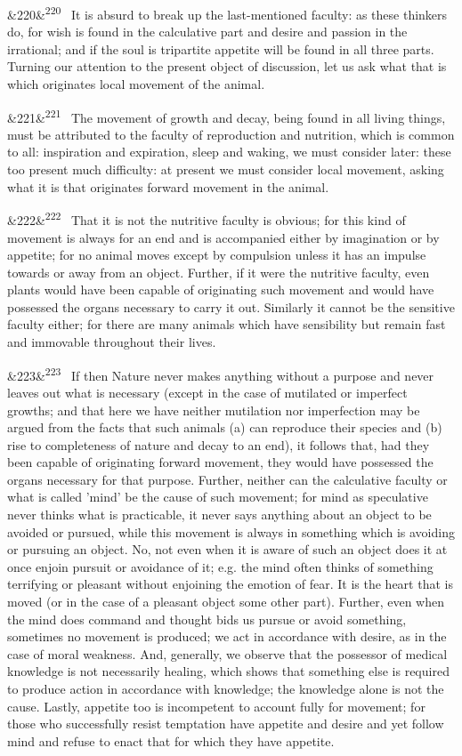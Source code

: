 \documentclass[12pt]{article}
\newcommand{\para}[1][]{\par\noindent\ifx&#1&\else\textsuperscript{\footnotesize #1}~\fi}
\begin{document}
\para[220] It is absurd to break up the last-mentioned faculty: as these thinkers do, for wish is found in the calculative part and desire and passion in the irrational; and if the soul is tripartite appetite will be found in all three parts. Turning our attention to the present object of discussion, let us ask what that is which originates local movement of the animal.

\para[221] The movement of growth and decay, being found in all living things, must be attributed to the faculty of reproduction and nutrition, which is common to all: inspiration and expiration, sleep and waking, we must consider later: these too present much difficulty: at present we must consider local movement, asking what it is that originates forward movement in the animal.

\para[222] That it is not the nutritive faculty is obvious; for this kind of movement is always for an end and is accompanied either by imagination or by appetite; for no animal moves except by compulsion unless it has an impulse towards or away from an object. Further, if it were the nutritive faculty, even plants would have been capable of originating such movement and would have possessed the organs necessary to carry it out. Similarly it cannot be the sensitive faculty either; for there are many animals which have sensibility but remain fast and immovable throughout their lives.

\para[223] If then Nature never makes anything without a purpose and never leaves out what is necessary (except in the case of mutilated or imperfect growths; and that here we have neither mutilation nor imperfection may be argued from the facts that such animals (a) can reproduce their species and (b) rise to completeness of nature and decay to an end), it follows that, had they been capable of originating forward movement, they would have possessed the organs necessary for that purpose. Further, neither can the calculative faculty or what is called 'mind' be the cause of such movement; for mind as speculative never thinks what is practicable, it never says anything about an object to be avoided or pursued, while this movement is always in something which is avoiding or pursuing an object. No, not even when it is aware of such an object does it at once enjoin pursuit or avoidance of it; e.g. the mind often thinks of something terrifying or pleasant without enjoining the emotion of fear. It is the heart that is moved (or in the case of a pleasant object some other part). Further, even when the mind does command and thought bids us pursue or avoid something, sometimes no movement is produced; we act in accordance with desire, as in the case of moral weakness. And, generally, we observe that the possessor of medical knowledge is not necessarily healing, which shows that something else is required to produce action in accordance with knowledge; the knowledge alone is not the cause. Lastly, appetite too is incompetent to account fully for movement; for those who successfully resist temptation have appetite and desire and yet follow mind and refuse to enact that for which they have appetite.
\end{document}
